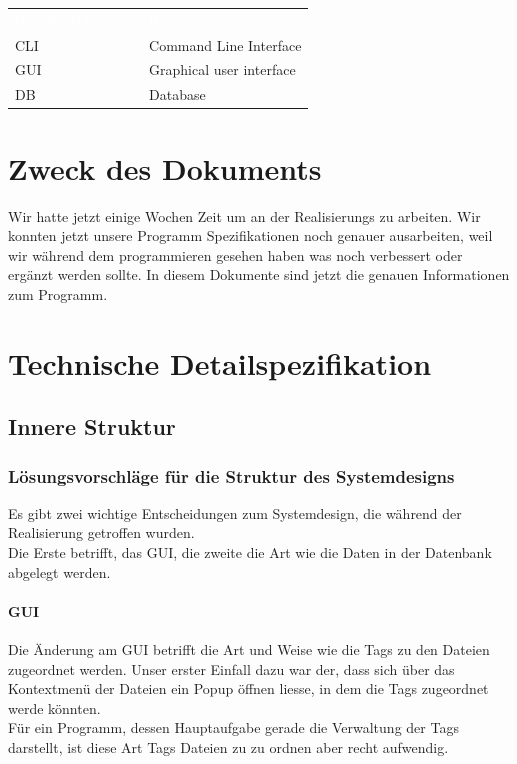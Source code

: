 \documentclass[10pt,paper=a4,final]{scrartcl}
\begin{document}
\begin{tabularx}{\textwidth}{l X}
\textcolor{white}{Begriff/ Abkürzung}\cellcolor{blue!80!} & \textcolor{white}{Bedeutung}\cellcolor{blue!80!} \\
CLI \cellcolor{blue!20!} & Command Line Interface\cellcolor{blue!20!} \\
GUI \cellcolor{blue!20!} & Graphical user interface \cellcolor{blue!20!} \\
DB \cellcolor{blue!20!} & Database\cellcolor{blue!20!} \\
\end{tabularx}
\newline
\newline
\newline

{}
\flushleft
\newpage
\tableofcontents
\newpage
\section{Zweck des Dokuments}
Wir hatte jetzt einige Wochen Zeit um an der Realisierungs zu arbeiten. Wir konnten jetzt unsere Programm Spezifikationen noch genauer ausarbeiten, weil wir während dem programmieren gesehen haben was noch verbessert oder ergänzt werden sollte. In diesem Dokumente sind jetzt die genauen Informationen zum Programm.
\section{Technische Detailspezifikation}
\subsection{Innere Struktur}
\subsubsection{L\"osungsvorschl\"age f\"ur die Struktur des Systemdesigns}
Es gibt zwei wichtige Entscheidungen zum Systemdesign, die w\"ahrend der Realisierung getroffen wurden.\\
Die Erste betrifft, das GUI, die zweite die Art wie die Daten in der Datenbank abgelegt werden.
\paragraph{GUI}
Die \"Anderung am GUI betrifft die Art und Weise wie die Tags zu den Dateien zugeordnet werden. Unser erster Einfall dazu war der, dass sich \"uber das Kontextmen\"u der Dateien ein Popup \"offnen liesse, in dem die Tags zugeordnet werde k\"onnten.\\
F\"ur ein Programm, dessen Hauptaufgabe gerade die Verwaltung der Tags darstellt, ist diese Art Tags Dateien zu zu ordnen aber recht aufwendig.
\end{document}
